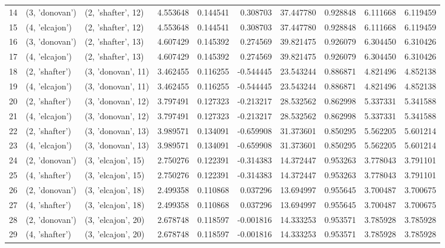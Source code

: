 \begin{tabular}{lllrrrrrrr}
14 &   (3, 'donovan') &  (2, 'shafter', 12) &  4.553648 &  0.144541 &  0.308703 &  37.447780 &  0.928848 &  6.111668 &  6.119459 \\
15 &   (4, 'elcajon') &  (2, 'shafter', 12) &  4.553648 &  0.144541 &  0.308703 &  37.447780 &  0.928848 &  6.111668 &  6.119459 \\
16 &   (3, 'donovan') &  (2, 'shafter', 13) &  4.607429 &  0.145392 &  0.274569 &  39.821475 &  0.926079 &  6.304450 &  6.310426 \\
17 &   (4, 'elcajon') &  (2, 'shafter', 13) &  4.607429 &  0.145392 &  0.274569 &  39.821475 &  0.926079 &  6.304450 &  6.310426 \\
18 &   (2, 'shafter') &  (3, 'donovan', 11) &  3.462455 &  0.116255 & -0.544445 &  23.543244 &  0.886871 &  4.821496 &  4.852138 \\
19 &   (4, 'elcajon') &  (3, 'donovan', 11) &  3.462455 &  0.116255 & -0.544445 &  23.543244 &  0.886871 &  4.821496 &  4.852138 \\
20 &   (2, 'shafter') &  (3, 'donovan', 12) &  3.797491 &  0.127323 & -0.213217 &  28.532562 &  0.862998 &  5.337331 &  5.341588 \\
21 &   (4, 'elcajon') &  (3, 'donovan', 12) &  3.797491 &  0.127323 & -0.213217 &  28.532562 &  0.862998 &  5.337331 &  5.341588 \\
22 &   (2, 'shafter') &  (3, 'donovan', 13) &  3.989571 &  0.134091 & -0.659908 &  31.373601 &  0.850295 &  5.562205 &  5.601214 \\
23 &   (4, 'elcajon') &  (3, 'donovan', 13) &  3.989571 &  0.134091 & -0.659908 &  31.373601 &  0.850295 &  5.562205 &  5.601214 \\
24 &   (2, 'donovan') &  (3, 'elcajon', 15) &  2.750276 &  0.122391 & -0.314383 &  14.372447 &  0.953263 &  3.778043 &  3.791101 \\
25 &   (4, 'shafter') &  (3, 'elcajon', 15) &  2.750276 &  0.122391 & -0.314383 &  14.372447 &  0.953263 &  3.778043 &  3.791101 \\
26 &   (2, 'donovan') &  (3, 'elcajon', 18) &  2.499358 &  0.110868 &  0.037296 &  13.694997 &  0.955645 &  3.700487 &  3.700675 \\
27 &   (4, 'shafter') &  (3, 'elcajon', 18) &  2.499358 &  0.110868 &  0.037296 &  13.694997 &  0.955645 &  3.700487 &  3.700675 \\
28 &   (2, 'donovan') &  (3, 'elcajon', 20) &  2.678748 &  0.118597 & -0.001816 &  14.333253 &  0.953571 &  3.785928 &  3.785928 \\
29 &   (4, 'shafter') &  (3, 'elcajon', 20) &  2.678748 &  0.118597 & -0.001816 &  14.333253 &  0.953571 &  3.785928 &  3.785928 \\

\end{tabular}
